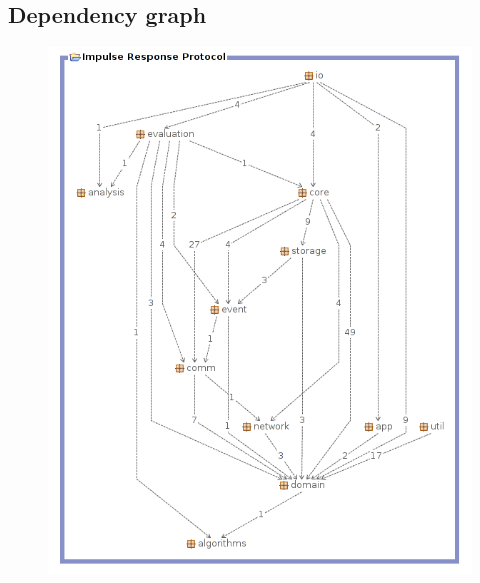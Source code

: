 \documentclass[a4paper,11pt,twoside]{report}
\begin{document}
\begin{appendices}
\section{Dependency graph}
\begin{figure} [H]
\centering
\includegraphics{../figures/dependency_graph.png}
\end{figure}

\end{appendices}
\end{document}
